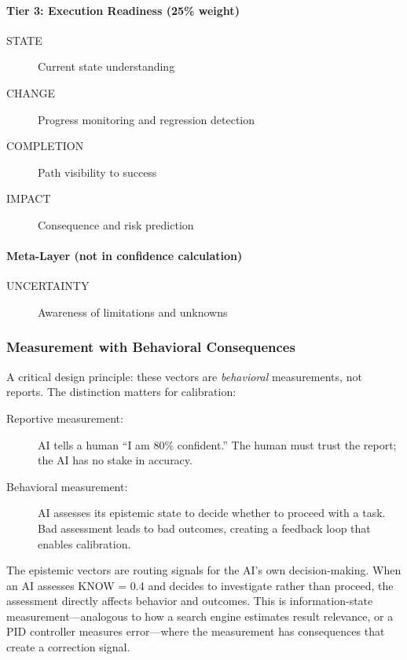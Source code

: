 \paragraph{Tier 3: Execution Readiness (25\% weight)}
\begin{description}
    \item[STATE] Current state understanding
    \item[CHANGE] Progress monitoring and regression detection
    \item[COMPLETION] Path visibility to success
    \item[IMPACT] Consequence and risk prediction
\end{description}

\paragraph{Meta-Layer (not in confidence calculation)}
\begin{description}
    \item[UNCERTAINTY] Awareness of limitations and unknowns
\end{description}

\subsubsection{Measurement with Behavioral Consequences}

A critical design principle: these vectors are \emph{behavioral} measurements, not reports. The distinction matters for calibration:

\begin{description}
    \item[Reportive measurement:] AI tells a human ``I am 80\% confident.'' The human must trust the report; the AI has no stake in accuracy.
    \item[Behavioral measurement:] AI assesses its epistemic state to decide whether to proceed with a task. Bad assessment leads to bad outcomes, creating a feedback loop that enables calibration.
\end{description}

The epistemic vectors are routing signals for the AI's own decision-making. When an AI assesses KNOW = 0.4 and decides to investigate rather than proceed, the assessment directly affects behavior and outcomes. This is information-state measurement---analogous to how a search engine estimates result relevance, or a PID controller measures error---where the measurement has consequences that create a correction signal.

